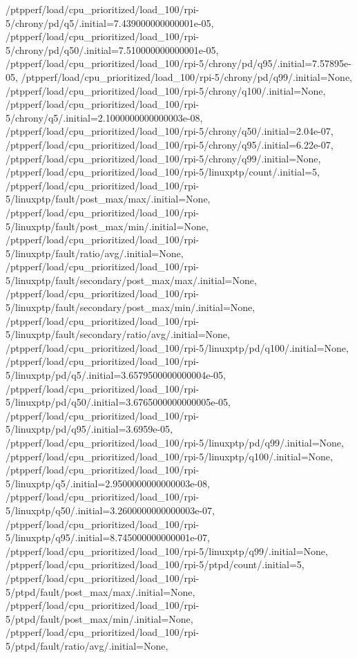 {    /ptpperf/load/cpu_prioritized/load_100/rpi-5/chrony/pd/q5/.initial=7.439000000000001e-05,
    /ptpperf/load/cpu_prioritized/load_100/rpi-5/chrony/pd/q50/.initial=7.510000000000001e-05,
    /ptpperf/load/cpu_prioritized/load_100/rpi-5/chrony/pd/q95/.initial=7.57895e-05,
    /ptpperf/load/cpu_prioritized/load_100/rpi-5/chrony/pd/q99/.initial=None,
    /ptpperf/load/cpu_prioritized/load_100/rpi-5/chrony/q100/.initial=None,
    /ptpperf/load/cpu_prioritized/load_100/rpi-5/chrony/q5/.initial=2.1000000000000003e-08,
    /ptpperf/load/cpu_prioritized/load_100/rpi-5/chrony/q50/.initial=2.04e-07,
    /ptpperf/load/cpu_prioritized/load_100/rpi-5/chrony/q95/.initial=6.22e-07,
    /ptpperf/load/cpu_prioritized/load_100/rpi-5/chrony/q99/.initial=None,
    /ptpperf/load/cpu_prioritized/load_100/rpi-5/linuxptp/count/.initial=5,
    /ptpperf/load/cpu_prioritized/load_100/rpi-5/linuxptp/fault/post_max/max/.initial=None,
    /ptpperf/load/cpu_prioritized/load_100/rpi-5/linuxptp/fault/post_max/min/.initial=None,
    /ptpperf/load/cpu_prioritized/load_100/rpi-5/linuxptp/fault/ratio/avg/.initial=None,
    /ptpperf/load/cpu_prioritized/load_100/rpi-5/linuxptp/fault/secondary/post_max/max/.initial=None,
    /ptpperf/load/cpu_prioritized/load_100/rpi-5/linuxptp/fault/secondary/post_max/min/.initial=None,
    /ptpperf/load/cpu_prioritized/load_100/rpi-5/linuxptp/fault/secondary/ratio/avg/.initial=None,
    /ptpperf/load/cpu_prioritized/load_100/rpi-5/linuxptp/pd/q100/.initial=None,
    /ptpperf/load/cpu_prioritized/load_100/rpi-5/linuxptp/pd/q5/.initial=3.6579500000000004e-05,
    /ptpperf/load/cpu_prioritized/load_100/rpi-5/linuxptp/pd/q50/.initial=3.6765000000000005e-05,
    /ptpperf/load/cpu_prioritized/load_100/rpi-5/linuxptp/pd/q95/.initial=3.6959e-05,
    /ptpperf/load/cpu_prioritized/load_100/rpi-5/linuxptp/pd/q99/.initial=None,
    /ptpperf/load/cpu_prioritized/load_100/rpi-5/linuxptp/q100/.initial=None,
    /ptpperf/load/cpu_prioritized/load_100/rpi-5/linuxptp/q5/.initial=2.9500000000000003e-08,
    /ptpperf/load/cpu_prioritized/load_100/rpi-5/linuxptp/q50/.initial=3.2600000000000003e-07,
    /ptpperf/load/cpu_prioritized/load_100/rpi-5/linuxptp/q95/.initial=8.745000000000001e-07,
    /ptpperf/load/cpu_prioritized/load_100/rpi-5/linuxptp/q99/.initial=None,
    /ptpperf/load/cpu_prioritized/load_100/rpi-5/ptpd/count/.initial=5,
    /ptpperf/load/cpu_prioritized/load_100/rpi-5/ptpd/fault/post_max/max/.initial=None,
    /ptpperf/load/cpu_prioritized/load_100/rpi-5/ptpd/fault/post_max/min/.initial=None,
    /ptpperf/load/cpu_prioritized/load_100/rpi-5/ptpd/fault/ratio/avg/.initial=None,
}
